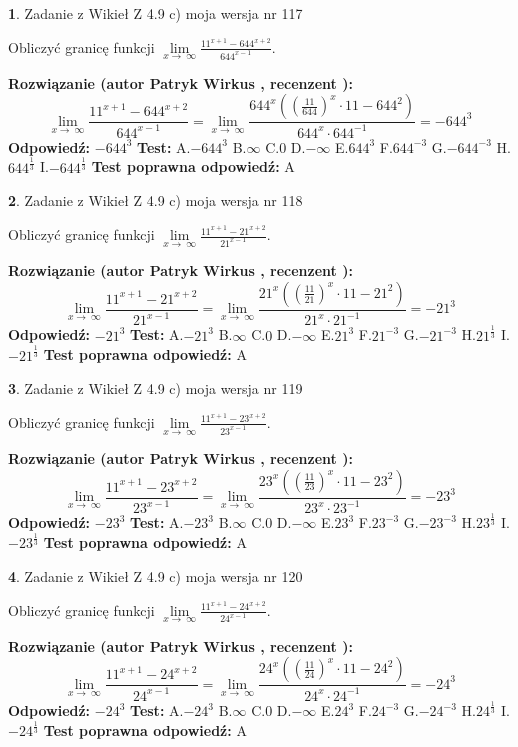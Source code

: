 \documentclass[12pt, a4paper]{article}
\theoremstyle{definition} %
\newtheorem{zad}{}
\newcommand{\zadStart}[1]{\begin{zad}#1\newline}
\newcommand{\zadStop}{\end{zad}}
\newcommand{\rozwStart}[2]{\noindent \textbf{Rozwiązanie (autor #1 , recenzent #2): }\newline}
\newcommand{\rozwStop}{\newline}
\newcommand{\odpStart}{\noindent \textbf{Odpowiedź:}\newline}
\newcommand{\odpStop}{\newline}
\newcommand{\testStart}{\noindent \textbf{Test:}\newline}
\newcommand{\testStop}{\newline}
\newcommand{\kluczStart}{\noindent \textbf{Test poprawna odpowiedź:}\newline}
\newcommand{\kluczStop}{\newline}
\begin{document}
\zadStart{Zadanie z Wikieł Z 4.9 c) moja wersja nr 117}


Obliczyć granicę funkcji  $\lim\limits_{x\to\ \infty}\frac{11^{x+1}-644^{x+2}}{644^{x-1}}$.
\zadStop
\rozwStart{Patryk Wirkus}{}
$$\lim\limits_{x\to\ \infty}\frac{11^{x+1}-644^{x+2}}{644^{x-1}}=\lim\limits_{x\to\ \infty}\frac{644^{x}((\frac{11}{644})^{x}\cdot 11 -644^{2})}{644^{x}\cdot 644^{-1}} = -644^{3}$$
\rozwStop
\odpStart
$-644^{3}$
\odpStop
\testStart
A.$-644^{3}$ B.$\infty$ C.$0$ D.$-\infty$ E.$644^{3}$
F.$644^{-3}$ G.$-644^{-3}$
H.$644^{\frac{1}{3}}$
I.$-644^{\frac{1}{3}}$
\testStop
\kluczStart
A
\kluczStop



\zadStart{Zadanie z Wikieł Z 4.9 c) moja wersja nr 118}


Obliczyć granicę funkcji  $\lim\limits_{x\to\ \infty}\frac{11^{x+1}-21^{x+2}}{21^{x-1}}$.
\zadStop
\rozwStart{Patryk Wirkus}{}
$$\lim\limits_{x\to\ \infty}\frac{11^{x+1}-21^{x+2}}{21^{x-1}}=\lim\limits_{x\to\ \infty}\frac{21^{x}((\frac{11}{21})^{x}\cdot 11 -21^{2})}{21^{x}\cdot 21^{-1}} = -21^{3}$$
\rozwStop
\odpStart
$-21^{3}$
\odpStop
\testStart
A.$-21^{3}$ B.$\infty$ C.$0$ D.$-\infty$ E.$21^{3}$
F.$21^{-3}$ G.$-21^{-3}$
H.$21^{\frac{1}{3}}$
I.$-21^{\frac{1}{3}}$
\testStop
\kluczStart
A
\kluczStop



\zadStart{Zadanie z Wikieł Z 4.9 c) moja wersja nr 119}


Obliczyć granicę funkcji  $\lim\limits_{x\to\ \infty}\frac{11^{x+1}-23^{x+2}}{23^{x-1}}$.
\zadStop
\rozwStart{Patryk Wirkus}{}
$$\lim\limits_{x\to\ \infty}\frac{11^{x+1}-23^{x+2}}{23^{x-1}}=\lim\limits_{x\to\ \infty}\frac{23^{x}((\frac{11}{23})^{x}\cdot 11 -23^{2})}{23^{x}\cdot 23^{-1}} = -23^{3}$$
\rozwStop
\odpStart
$-23^{3}$
\odpStop
\testStart
A.$-23^{3}$ B.$\infty$ C.$0$ D.$-\infty$ E.$23^{3}$
F.$23^{-3}$ G.$-23^{-3}$
H.$23^{\frac{1}{3}}$
I.$-23^{\frac{1}{3}}$
\testStop
\kluczStart
A
\kluczStop



\zadStart{Zadanie z Wikieł Z 4.9 c) moja wersja nr 120}


Obliczyć granicę funkcji  $\lim\limits_{x\to\ \infty}\frac{11^{x+1}-24^{x+2}}{24^{x-1}}$.
\zadStop
\rozwStart{Patryk Wirkus}{}
$$\lim\limits_{x\to\ \infty}\frac{11^{x+1}-24^{x+2}}{24^{x-1}}=\lim\limits_{x\to\ \infty}\frac{24^{x}((\frac{11}{24})^{x}\cdot 11 -24^{2})}{24^{x}\cdot 24^{-1}} = -24^{3}$$
\rozwStop
\odpStart
$-24^{3}$
\odpStop
\testStart
A.$-24^{3}$ B.$\infty$ C.$0$ D.$-\infty$ E.$24^{3}$
F.$24^{-3}$ G.$-24^{-3}$
H.$24^{\frac{1}{3}}$
I.$-24^{\frac{1}{3}}$
\testStop
\kluczStart
A
\kluczStop
\end{document}
